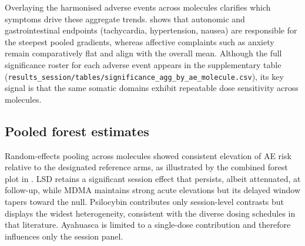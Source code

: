 
Overlaying the harmonised adverse events across molecules clarifies which symptoms drive these aggregate trends.  shows that autonomic and gastrointestinal endpoints (tachycardia, hypertension, nausea) are responsible for the steepest pooled gradients, whereas affective complaints such as anxiety remain comparatively flat and align with the overall mean. Although the full significance roster for each adverse event appears in the supplementary table (\texttt{results\_session/tables/significance\_agg\_by\_ae\_molecule.csv}), its key signal is that the same somatic domains exhibit repeatable dose sensitivity across molecules.


\subsection{Pooled forest estimates}
Random-effects pooling across molecules showed consistent elevation of AE risk relative to the designated reference arms, as illustrated by the combined forest plot in . LSD retains a significant session effect that persists, albeit attenuated, at follow-up, while MDMA maintains strong acute elevations but its delayed window tapers toward the null. Psilocybin contributes only session-level contrasts but displays the widest heterogeneity, consistent with the diverse dosing schedules in that literature. Ayahuasca is limited to a single-dose contribution and therefore influences only the session panel.

